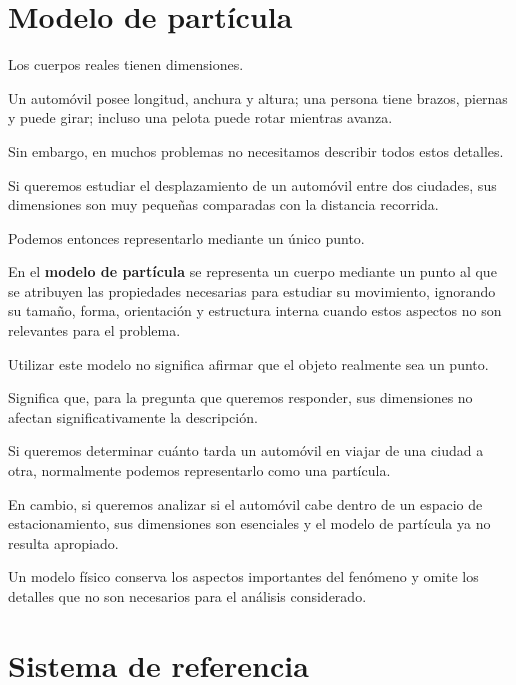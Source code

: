 \section{Modelo de partícula}

Los cuerpos reales tienen dimensiones.

Un automóvil posee longitud, anchura y altura; una persona tiene brazos,
piernas y puede girar; incluso una pelota puede rotar mientras avanza.

Sin embargo, en muchos problemas no necesitamos describir todos estos
detalles.

Si queremos estudiar el desplazamiento de un automóvil entre dos ciudades,
sus dimensiones son muy pequeñas comparadas con la distancia recorrida.

Podemos entonces representarlo mediante un único punto.

\begin{modelo}
En el \textbf{modelo de partícula} se representa un cuerpo mediante un punto
al que se atribuyen las propiedades necesarias para estudiar su movimiento,
ignorando su tamaño, forma, orientación y estructura interna cuando estos
aspectos no son relevantes para el problema.
\end{modelo}

Utilizar este modelo no significa afirmar que el objeto realmente sea un
punto.

Significa que, para la pregunta que queremos responder, sus dimensiones no
afectan significativamente la descripción.

\begin{ejemplo}
Si queremos determinar cuánto tarda un automóvil en viajar de una ciudad a
otra, normalmente podemos representarlo como una partícula.

En cambio, si queremos analizar si el automóvil cabe dentro de un espacio
de estacionamiento, sus dimensiones son esenciales y el modelo de partícula
ya no resulta apropiado.
\end{ejemplo}

\begin{interpretacion}
Un modelo físico conserva los aspectos importantes del fenómeno y omite los
detalles que no son necesarios para el análisis considerado.
\end{interpretacion}


\section{Sistema de referencia}

